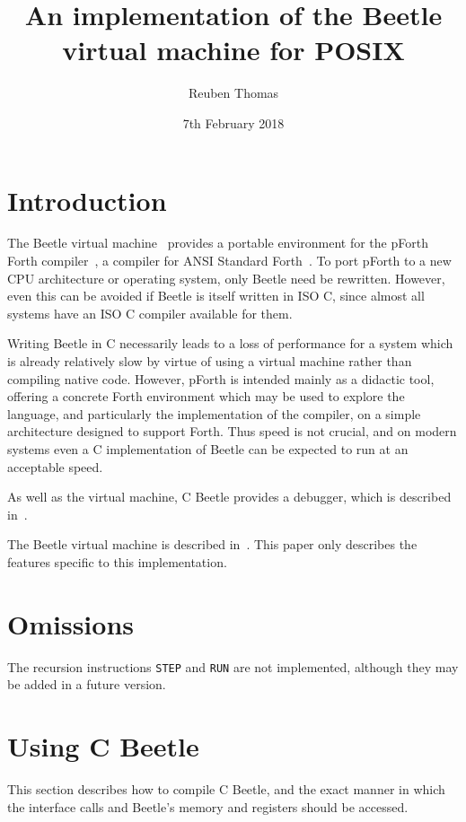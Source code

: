 \documentclass[english]{article}
\title{An implementation of the Beetle virtual machine for POSIX}
\author{Reuben Thomas}
\date{7th February 2018}
\begin{document}
\maketitle


\section{Introduction}

The Beetle virtual machine~\cite{beetle} provides a portable environment
for the pForth Forth compiler~\cite{beetledis}, a compiler for ANSI Standard
Forth~\cite{ANSIforth}. To port pForth to a new CPU architecture or operating system, only Beetle need be rewritten. However, even this can be
avoided if Beetle is itself written in ISO C, since almost all systems have
an ISO C compiler available for them.

Writing Beetle in C necessarily leads to a loss of performance for a system
which is already relatively slow by virtue of using a virtual machine
rather than compiling native code. However, pForth is intended mainly as a
didactic tool, offering a concrete Forth environment which may be used to
explore the language, and particularly the implementation of the compiler, on
a simple architecture designed to support Forth. Thus speed is not crucial,
and on modern systems even a C implementation of Beetle can be expected to
run at an acceptable speed.

As well as the virtual machine, C Beetle provides a debugger, which is described in~\cite{beetleuiface}.

The Beetle virtual machine is described in~\cite{beetle}. This paper only
describes the features specific to this implementation.


\section{Omissions}

The recursion instructions {\tt STEP} and {\tt RUN} are not implemented,
although they may be added in a future version.


\section{Using C Beetle}

This section describes how to compile C Beetle, and the exact manner in which
the interface calls and Beetle's memory and registers should be accessed.
\end{document}
